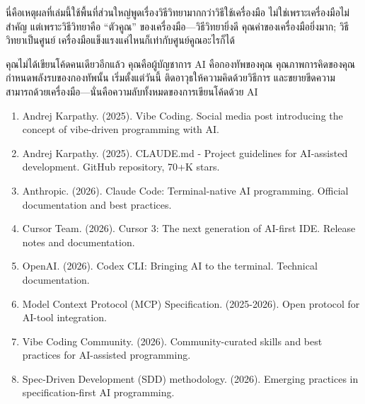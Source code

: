 นี่คือเหตุผลที่เล่มนี้ใช้พื้นที่ส่วนใหญ่พูดเรื่องวิธีวิทยามากกว่าวิธีใช้เครื่องมือ ไม่ใช่เพราะเครื่องมือไม่สำคัญ แต่เพราะวิธีวิทยาคือ “ตัวคูณ” ของเครื่องมือ—วิธีวิทยายิ่งดี คุณค่าของเครื่องมือยิ่งมาก; วิธีวิทยาเป็นศูนย์ เครื่องมือแข็งแรงแค่ไหนก็เท่ากับศูนย์คูณอะไรก็ได้

คุณไม่ได้เขียนโค้ดคนเดียวอีกแล้ว คุณคือผู้บัญชาการ AI คือกองทัพของคุณ คุณภาพการคิดของคุณกำหนดพลังรบของกองทัพนั้น เริ่มตั้งแต่วันนี้ ติดอาวุธให้ความคิดด้วยวิธีการ และขยายขีดความสามารถด้วยเครื่องมือ—นั่นคือความลับทั้งหมดของการเขียนโค้ดด้วย AI


\begin{enumerate}
  \item Andrej Karpathy. (2025). Vibe Coding. Social media post introducing the concept of vibe-driven programming with AI.
  \item Andrej Karpathy. (2025). CLAUDE.md - Project guidelines for AI-assisted development. GitHub repository, 70+K stars.
  \item Anthropic. (2026). Claude Code: Terminal-native AI programming. Official documentation and best practices.
  \item Cursor Team. (2026). Cursor 3: The next generation of AI-first IDE. Release notes and documentation.
  \item OpenAI. (2026). Codex CLI: Bringing AI to the terminal. Technical documentation.
  \item Model Context Protocol (MCP) Specification. (2025-2026). Open protocol for AI-tool integration.
  \item Vibe Coding Community. (2026). Community-curated skills and best practices for AI-assisted programming.
  \item Spec-Driven Development (SDD) methodology. (2026). Emerging practices in specification-first AI programming.
\end{enumerate}
